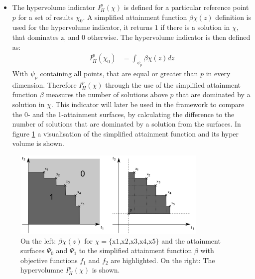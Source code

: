 \documentclass[12pt,twoside]{article}
\theoremstyle{plain}
\theoremstyle{definition}
\theoremstyle{remark}
\begin{document}
\begin{itemize}
	\item The hypervolume indicator $I^p_H(\chi)$ is defined for a particular reference point $p$ for a set of results $\chi_0$. A simplified attainment function $\beta\chi(z)$ definition is used for the hypervolume indicator, it returns $1$ if there is a solution in $\chi$, that dominates z, and $0$ otherwise. The hypervolume indicator is then defined as:
	\vspace*{-0.3cm}
	\begin{align*}
		I^p_H(\chi_0) &= \int_{\psi_p}\beta\chi(z) dz
	\end{align*}
	With $\psi_p$ containing all points, that are equal or greater than $p$ in every dimension.
	Therefore $I^p_H(\chi)$ through the use of the simplified attainment function $\beta$ measures the number of solutions above $p$ that are dominated by a solution in $\chi$.
	This indicator will later be used in the framework to compare the 0- and the 1-attainment surfaces, by calculating the difference to the number of solutions that are dominated by a solution from the surfaces.
	In figure \ref{fig:attainment} a visualisation of the simplified attainment function and its hyper volume is shown.
\end{itemize}
 \addtocounter{footnote}{-1}
 \begin{figure}[h]
 	\begin{center}
 		\vspace*{-0.65cm}
 		\includegraphics[width=0.83\textwidth]{Bilder/attainment.png}
 	\end{center}
 	\vspace*{-0.8cm}
 	\caption[On the left: $\beta\chi(z)$ for $\chi = \text{\{x1,x2,x3,x4,x5\}}$ and the attainment surfaces $\Psi_0$ and $\Psi_1$ to the simplified attainment function $\beta$ with objective functions $f_1$ and $f_2$ are highlighted. On the right: The hypervolumne $I^p_H(\chi)$ is shown.]{On the left: $\beta\chi(z)$ for $\chi = \text{\{x1,x2,x3,x4,x5\}}$ and the attainment surfaces $\Psi_0$ and $\Psi_1$ to the simplified attainment function $\beta$ with objective functions $f_1$ and $f_2$ are highlighted. On the right: The hypervolumne $I^p_H(\chi)$ is shown. \footnotemark}
 	\label{fig:attainment}
 \end{figure}
\end{document}
